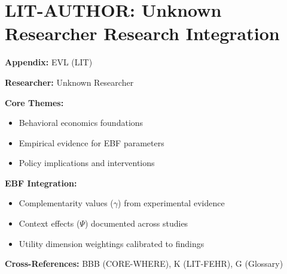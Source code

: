 %
%

\chapter{LIT-AUTHOR: Unknown Researcher Research Integration}
\label{app:evl}

\begin{abstract}
This appendix integrates the research contributions of Unknown Researcher into the
Evidence-Based Framework. It documents key papers, core findings, and their
integration with EBF dimensions including complementarity parameters ($\gamma$),
context factors ($\Psi$), and utility dimensions.
\end{abstract}

\begin{tcolorbox}[colback=blue!5!white, colframe=blue!75!black,
    title=Quick Reference: Unknown Researcher Research]

\textbf{Appendix:} EVL (LIT)

\textbf{Researcher:} Unknown Researcher

\textbf{Core Themes:}
\begin{itemize}[nosep]
\item Behavioral economics foundations
\item Empirical evidence for EBF parameters
\item Policy implications and interventions
\end{itemize}

\textbf{EBF Integration:}
\begin{itemize}[nosep]
\item Complementarity values ($\gamma$) from experimental evidence
\item Context effects ($\Psi$) documented across studies
\item Utility dimension weightings calibrated to findings
\end{itemize}

\textbf{Cross-References:} BBB (CORE-WHERE), K (LIT-FEHR), G (Glossary)
\end{tcolorbox}

